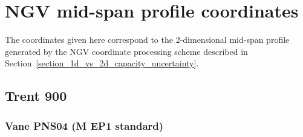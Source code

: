 \documentclass[a4paper, 11pt, oneside]{report}
\begin{document}
\chapter{NGV mid-span profile coordinates}

The coordinates given here correspond to the 2-dimensional mid-span profile generated by the NGV coordinate processing scheme described in Section~\ref{section_1d_vs_2d_capacity_uncertainty}.

\newsavebox\ltmcbox

\section{Trent 900}

\subsection{Vane PNS04 (M EP1 standard)}
\end{document}
